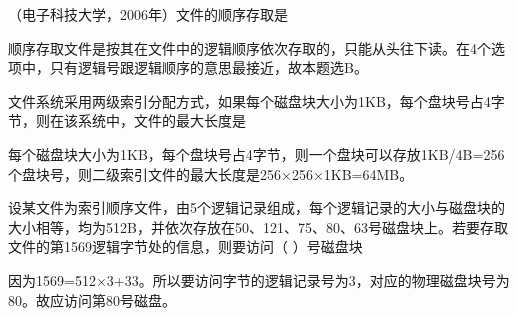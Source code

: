 \question （电子科技大学，2006年）文件的顺序存取是
\par{}
\begin{solution}顺序存取文件是按其在文件中的逻辑顺序依次存取的，只能从头往下读。在4个选项中，只有逻辑号跟逻辑顺序的意思最接近，故本题选B。
\end{solution}
\question 文件系统采用两级索引分配方式，如果每个磁盘块大小为1KB，每个盘块号占4字节，则在该系统中，文件的最大长度是
\par{}
\begin{solution}每个磁盘块大小为1KB，每个盘块号占4字节，则一个盘块可以存放1KB/4B=256个盘块号，则二级索引文件的最大长度是256×256×1KB=64MB。
\end{solution}
\question 设某文件为索引顺序文件，由5个逻辑记录组成，每个逻辑记录的大小与磁盘块的大小相等，均为512B，并依次存放在50、121、75、80、63号磁盘块上。若要存取文件的第1569逻辑字节处的信息，则要访问（
）号磁盘块
\par{}
\begin{solution}因为1569=512×3+33。所以要访问字节的逻辑记录号为3，对应的物理磁盘块号为80。故应访问第80号磁盘。
\end{solution}

